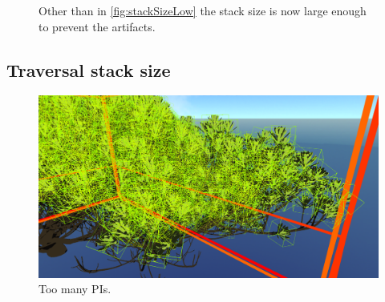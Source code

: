 \begin{figure}
\caption{Other than in \ref{fig:stackSizeLow} the stack size is now large enough to prevent the artifacts.}
\label{fig:stackSizeHigh}
\end{figure}

\newpage
\subsection{Traversal stack size}
\label{sec:OptStackSize}

\begin{figure}
    \centering
    \includegraphics[width=.8\textwidth]{images/showcase/ManyAABBs.PNG}
    \caption{Too many PIs.}
    \label{fig:manyAABBs}
\end{figure}

